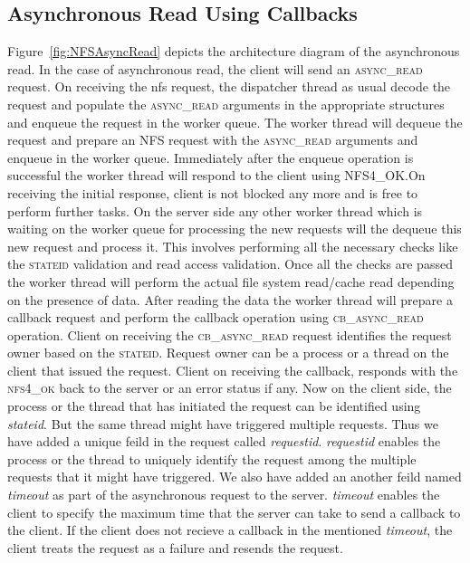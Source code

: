 \subsection{Asynchronous Read Using Callbacks}

Figure~\ref{fig:NFSAsyncRead} depicts the architecture diagram of the asynchronous read. 
In the case of asynchronous read, the client will send an \textsc{async\_read} request. On receiving the nfs request, the dispatcher thread as usual decode the request and populate the \textsc{async\_read} arguments in the appropriate structures and enqueue the request in the worker queue. The worker thread will dequeue the request and prepare an NFS request with the \textsc{async\_read} arguments and enqueue in the worker queue. Immediately after the enqueue operation is successful the worker thread will respond to the client using \textsc{NFS4\_OK}.On receiving the initial response, client is not blocked any more and is free to perform further tasks. On the server side any other worker thread which is waiting on the worker queue for processing the new requests will the dequeue this new request and process it. This involves performing all the necessary checks like the \textsc{stateid} validation and read access validation. Once all the checks are passed the worker thread will perform the actual file system read/cache read depending on the presence of data. After reading the data the worker thread will prepare a callback request and perform the callback operation using \textsc{cb\_async\_read} operation. Client on receiving the \textsc{cb\_async\_read} request identifies the request owner based on the \textsc{stateid}. Request owner can  be a process or a thread on the client that issued the request. Client on receiving the callback, responds with the \textsc{nfs4\_ok} back to the server or an error status if any. Now on the client side, the process or the thread that has initiated the request can be identified using \textit{stateid}. But the same thread might have triggered multiple requests. Thus we have added a unique feild in the request called \textit{requestid}.  \textit{requestid} enables the process or the thread to uniquely identify the request among the multiple requests that it might have triggered. We also have added an another feild named  \textit{timeout} as part of  the asynchronous request to the server. \textit{timeout} enables the client to specify the maximum time that the server can take to send a callback to the client. If the client does not recieve a callback in the mentioned  \textit{timeout}, the client treats the request as a failure and resends the request.


